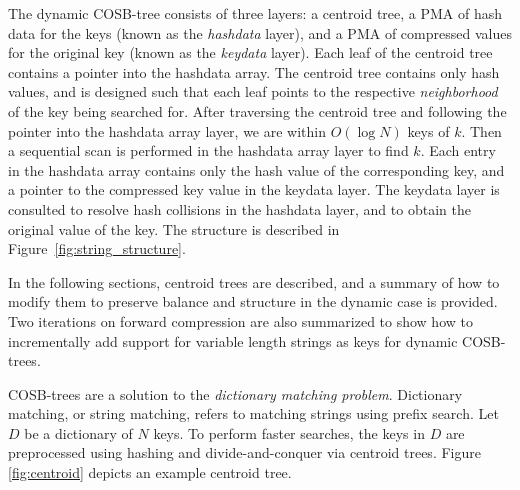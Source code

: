 \documentclass[preprint]{style}
\begin{document}
The dynamic COSB-tree consists of three layers: a centroid tree, a PMA 
of hash data for the keys (known as the 
\emph{hashdata} layer), and a PMA of compressed values for the original key
 (known as the 
\emph{keydata} layer). Each leaf of the centroid tree contains a pointer into
the hashdata array. The centroid tree contains only hash values, and is designed such that
each leaf points to the respective \emph{neighborhood} of the key being
searched for. After traversing the centroid tree and following the pointer into
the hashdata array layer, we are within $O(\log{}N)$ keys of $k$. Then a
sequential scan is performed in the hashdata array layer to find $k$. Each
entry in the hashdata array contains only the hash value of the corresponding key,
and a pointer to the compressed key value in the keydata layer. The keydata layer
is consulted to resolve hash collisions in the hashdata layer, and to obtain the original value of the key.
The structure is described in Figure~\ref{fig:string_structure}.



In the following sections, centroid trees are described, and a summary of
how to modify them to preserve balance and structure in the dynamic case is
provided. Two iterations on forward compression are also summarized to show
how to incrementally add support for variable length strings as keys for
dynamic COSB-trees.

COSB-trees are a solution to the \textit{dictionary matching problem}.
Dictionary matching, or string matching, refers to matching strings using
prefix search. Let $D$ be a dictionary of $N$ keys. To perform faster searches,
the keys in $D$ are preprocessed using hashing and divide-and-conquer via
centroid trees. Figure \ref{fig:centroid} depicts an example centroid tree.
\end{document}
